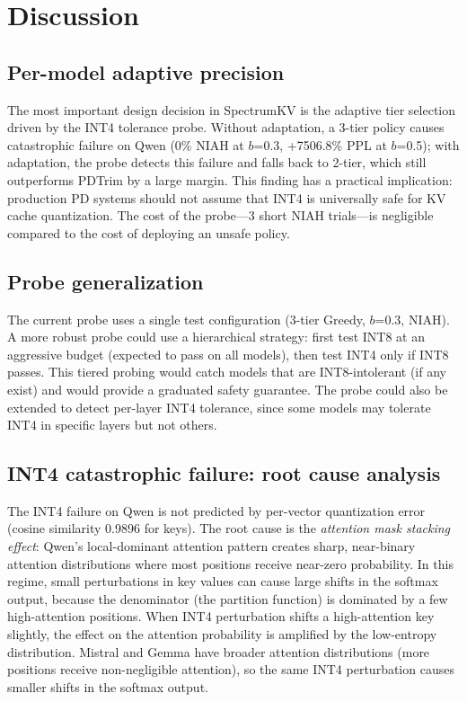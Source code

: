 \documentclass[11pt]{article}
\newcommand{\method}{SpectrumKV}
\newcommand{\pct}{\%}
\theoremstyle{definition}
\theoremstyle{plain}
\begin{document}
\section{Discussion}
\label{sec:discussion}

\subsection{Per-model adaptive precision}
The most important design decision in \method{} is the adaptive tier selection driven by the INT4 tolerance probe.  Without adaptation, a 3-tier policy causes catastrophic failure on Qwen (0\pct{} NIAH at $b$=0.3, +7506.8\pct{} PPL at $b$=0.5); with adaptation, the probe detects this failure and falls back to 2-tier, which still outperforms PDTrim by a large margin.  This finding has a practical implication: production PD systems should not assume that INT4 is universally safe for KV cache quantization.  The cost of the probe---3 short NIAH trials---is negligible compared to the cost of deploying an unsafe policy.

\subsection{Probe generalization}
The current probe uses a single test configuration (3-tier Greedy, $b$=0.3, NIAH).  A more robust probe could use a hierarchical strategy: first test INT8 at an aggressive budget (expected to pass on all models), then test INT4 only if INT8 passes.  This tiered probing would catch models that are INT8-intolerant (if any exist) and would provide a graduated safety guarantee.  The probe could also be extended to detect per-layer INT4 tolerance, since some models may tolerate INT4 in specific layers but not others.

\subsection{INT4 catastrophic failure: root cause analysis}
The INT4 failure on Qwen is not predicted by per-vector quantization error (cosine similarity 0.9896 for keys).  The root cause is the \emph{attention mask stacking effect}: Qwen's local-dominant attention pattern creates sharp, near-binary attention distributions where most positions receive near-zero probability.  In this regime, small perturbations in key values can cause large shifts in the softmax output, because the denominator (the partition function) is dominated by a few high-attention positions.  When INT4 perturbation shifts a high-attention key slightly, the effect on the attention probability is amplified by the low-entropy distribution.  Mistral and Gemma have broader attention distributions (more positions receive non-negligible attention), so the same INT4 perturbation causes smaller shifts in the softmax output.
\end{document}
